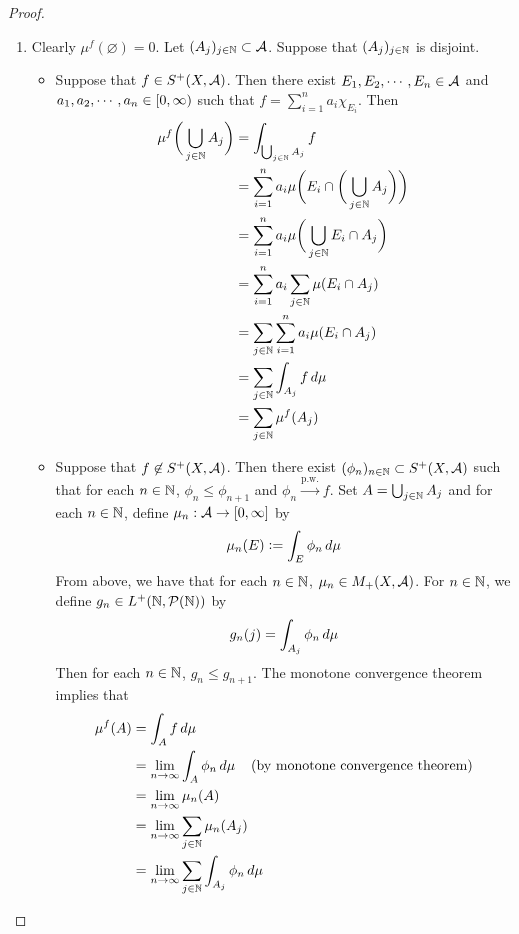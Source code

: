 \documentclass{book}
\begin{document}
	\begin{proof}\
		\begin{enumerate}
			\item Clearly $\mu^f(\varnothing) = 0$. Let $(A_j)_{j \in \mathbb{N}} \subset \mathcal{A}$. Suppose that $(A_j)_{j \in \mathbb{N}}$ is disjoint. 
			\begin{itemize}
				\item Suppose that $f \in S^+(X, \mathcal{A})$. Then there exist $E_1, E_2, \cdots, E_n \in \mathcal{A}$ and  $a_1, a_2, \cdots, a_n \in [0,\infty)$ such that $f = \sum\limits_{i=1}^n a_i \chi_{E_i}$. Then 
				\begin{align*}
					\mu^f\bigg(\bigcup_{j \in \mathbb{N}} A_j\bigg) 
					&= \int_{\bigcup_{j \in \mathbb{N}} A_j} f\\
					&= \sum_{i = 1} ^n a_i\mu\bigg(E_i \cap \bigg(\bigcup_{j \in \mathbb{N}} A_j\bigg)\bigg)\\
					&= \sum_{i = 1} ^n a_i\mu\bigg(\bigcup_{j \in \mathbb{N}} E_i \cap A_j\bigg)\\
					&= \sum_{i = 1} ^n a_i \sum_{j \in \mathbb{N}} \mu(E_i \cap A_j)\\
					&= \sum_{j \in \mathbb{N}} \sum_{i = 1} ^n a_i \mu(E_i \cap A_j)\\
					&= \sum_{j \in \mathbb{N}} \int_{A_j} f \, d \mu\\
					&= \sum_{j \in \mathbb{N}} \mu^f(A_j)
				\end{align*}  
				\item Suppose that $f \not \in S^+(X, \mathcal{A})$. Then there exist $(\phi_n)_{n \in \mathbb{N}} \subset S^+(X, \mathcal{A})$ such that for each $n \in \mathbb{N}$, $\phi_n \leq \phi_{n+1}$ and $\phi_n \xrightarrow{\text{p.w.}} f$. Set $A = \bigcup_{j \in \mathbb{N}} A_j$ and for each $n \in \mathbb{N}$, define $\mu_n: \mathcal{A} \rightarrow [0,\infty]$ by 
				$$\mu_n(E) \vcentcolon= \int_E \phi_n \, d \mu$$ 
				From above, we have that for each $n \in \mathbb{N}$, $\mu_n \in M_+(X, \mathcal{A})$. For $n \in \mathbb{N}$, we define $g_n \in L^+(\mathbb{N}, \mathcal{P}(\mathbb{N}))$ by 
				$$g_n(j) = \int_{A_j} \phi_n \, d \mu $$ 
				Then for each $n \in \mathbb{N}$, $g_n \leq g_{n+1}$. 
				The monotone convergence theorem implies that
				\begin{align*}
					\mu^f(A) 
					& = \int_A f \dmu\\
					& = \limn \int_A \phi_n \dmu \hspace{4mm} \text{(by monotone convergence theorem)} \\ 
					& = \limn \mu_n(A) \\
					& = \limn \sum_{j \in \N} \mu_n(A_j)  \\
					& = \limn \sum_{j \in \N} \int_{A_j} \phi_n \dmu\\

\end{align*}
\end{itemize}
\end{enumerate}
\end{proof}
\end{document}
